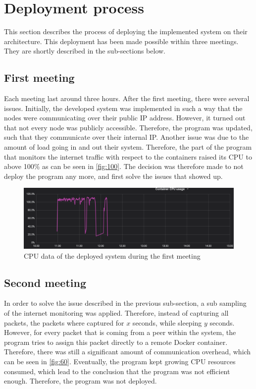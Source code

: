 \section{Deployment process} \label{sec:sb-process}
This section describes the process of deploying the implemented system on their architecture. This deployment has been made possible within three meetings. They are shortly described in the sub-sections below.

\subsection{First meeting}
Each meeting last around three hours. After the first meeting, there were several issues. Initially, the developed system was implemented in such a way that the nodes were communicating over their public IP address. However, it turned out that not every node was publicly accessible. Therefore, the program was updated, such that they communicate over their internal IP. Another issue was due to the amount of load going in and out their system. Therefore, the part of the program that monitors the internet traffic with respect to the containers raised its CPU to above 100\% as can be seen in \autoref{fig:100}.
The decision was therefore made to not deploy the program any more, and first solve the issues that showed up.

\begin{figure}
    \centering
    \includegraphics[width=\textwidth]{gfx/load-100.png}
    \caption{CPU data of the deployed system during the first meeting}
    \label{fig:100}
\end{figure}

\subsection{Second meeting}
In order to solve the issue described in the previous sub-section, a sub sampling of the internet monitoring was applied. Therefore, instead of capturing all packets, the packets where captured for $x$ seconds, while sleeping $y$ seconds. However, for every packet that is coming from a peer within the system, the program tries to assign this packet directly to a remote Docker container. Therefore, there was still a significant amount of communication overhead, which can be seen in \autoref{fig:60}. Eventually, the program kept growing CPU resources consumed, which lead to the conclusion that the program was not efficient enough. Therefore, the program was not deployed.


